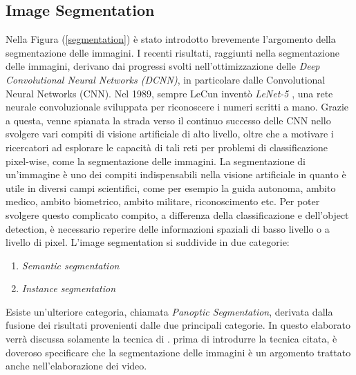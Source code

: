 \subsection{Image Segmentation}
Nella Figura (\ref{segmentation}) è stato introdotto brevemente l'argomento della segmentazione 
delle immagini.  I recenti risultati, raggiunti nella segmentazione 
delle immagini, derivano dai progressi svolti nell'ottimizzazione delle \emph{Deep 
Convolutional Neural Networks (DCNN)}, in particolare dalle Convolutional Neural Networks (CNN). 
Nel 1989, sempre LeCun inventò \emph{LeNet-5} \cite{LeNet-5}, 
una rete neurale convoluzionale sviluppata per riconoscere i numeri scritti a 
mano. Grazie a questa, venne spianata la strada verso il continuo successo 
delle CNN nello svolgere vari compiti di visione artificiale di alto livello, 
oltre che a motivare i ricercatori ad esplorare le capacità di tali reti per 
problemi di classificazione pixel-wise, come la segmentazione delle immagini. 
La segmentazione di un'immagine è uno dei  compiti indispensabili nella 
visione artificiale in quanto è utile in diversi campi scientifici, come per 
esempio la guida autonoma, ambito medico, ambito biometrico, ambito 
militare, riconoscimento etc. Per poter svolgere questo complicato compito, 
a differenza della classificazione e dell'object detection, è necessario reperire 
delle informazioni spaziali di basso livello o a livello di pixel. L'image 
segmentation si suddivide in due categorie:
\begin{enumerate}
    \item \emph{Semantic segmentation}
    \item \emph{Instance segmentation}
\end{enumerate}
Esiste un'ulteriore categoria, chiamata \emph{Panoptic Segmentation}, derivata 
dalla fusione dei risultati provenienti dalle due principali categorie. In questo 
elaborato verrà discussa solamente la tecnica di . prima di introdurre la 
tecnica citata, è doveroso specificare che la segmentazione delle immagini 
è un argomento trattato anche nell'elaborazione dei video.

